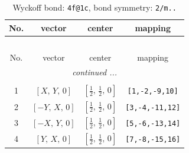 \documentclass[fleqn,8pt]{jsarticle}
\begin{document}
\renewcommand{\arraystretch}{1.2}
\begin{longtable}{cccc}
\caption{Wyckoff bond: {\tt 4f@1c}, bond symmetry: {\tt 2/m..}}
 \\
 \hline \hline
No. & vector & center & mapping \\ \hline \endfirsthead

\multicolumn{3}{l}{\tablename\ \thetable{}} \\
 \hline \hline
No. & vector & center & mapping \\ \hline \endhead

 \hline \hline
\multicolumn{3}{r}{\footnotesize\it continued ...} \\ \endfoot

 \hline \hline
\multicolumn{3}{r}{} \\ \endlastfoot

1 & $\left[ X,\, Y,\, 0 \right]$ & $\left[ \frac{1}{2},\, \frac{1}{2},\, 0 \right]$ & {\tt [1,-2,-9,10]} \\ \hline
2 & $\left[ - Y,\, X,\, 0 \right]$ & $\left[ \frac{1}{2},\, \frac{1}{2},\, 0 \right]$ & {\tt [3,-4,-11,12]} \\ \hline
3 & $\left[ - X,\, Y,\, 0 \right]$ & $\left[ \frac{1}{2},\, \frac{1}{2},\, 0 \right]$ & {\tt [5,-6,-13,14]} \\ \hline
4 & $\left[ Y,\, X,\, 0 \right]$ & $\left[ \frac{1}{2},\, \frac{1}{2},\, 0 \right]$ & {\tt [7,-8,-15,16]} \\
\end{longtable}
\renewcommand{\arraystretch}{1.2}
\end{document}
